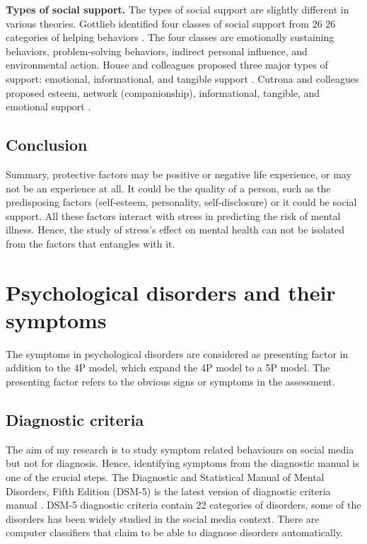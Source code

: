 \textbf{Types of social support.} The types of social support are slightly different in various theories. Gottlieb identified four classes of social support from 26  26 categories of helping behaviors \cite{gottlieb1978development}. The four classes are emotionally sustaining behaviors, problem-solving behaviors, indirect personal influence, and environmental action. House and colleagues proposed three major types of support: emotional, informational, and tangible support \cite{house1985social}. Cutrona and colleagues proposed esteem, network (companionship), informational, tangible, and emotional support \cite{cutrona1990interpersonal}.


\subsection{Conclusion}
Summary, protective factors may be positive or negative life experience, or may not be an experience at all. It could be the quality of a person, such as the predisposing factors (self-esteem, personality, self-disclosure) or it could be social support. All these factors interact with stress in predicting the risk of mental illness. Hence, the study of stress's effect on mental health can not be isolated from the factors that entangles with it. 


\section{Psychological disorders and their symptoms}

The symptoms in psychological disorders are considered as presenting factor in addition to the 4P model, which expand the 4P model to a 5P model. The presenting factor refers to the obvious signs or symptoms in the assessment.

\subsection{Diagnostic criteria}
The aim of my research is to study symptom related behaviours on social media but not for diagnosis. Hence, identifying symptoms from the diagnostic manual is one of the crucial steps. The Diagnostic and Statistical Manual of Mental Disorders, Fifth Edition (DSM-5) is the latest version of diagnostic criteria manual \cite{american2013diagnostic}. DSM-5 diagnostic criteria contain 22 categories of disorders, some of the disorders has been widely studied in the social media context. There are computer classifiers that claim to be able to diagnose disorders automatically.


